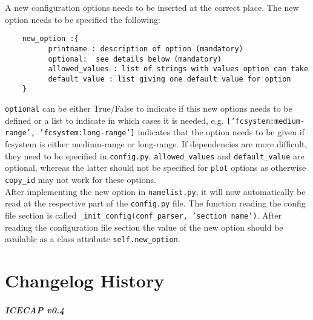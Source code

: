 \documentclass[DIV=10, parskip=full]{scrreprt}
\newcommand{\ice}{\textit{ICECAP}\xspace}
\begin{document}

A new configuration options needs to be inserted at the correct place. The new option needs to be specified the following:\\
\begin{verbatim}
	new_option :{
	      printname : description of option (mandatory)
	      optional:  see details below (mandatory)
	      allowed_values : list of strings with values option can take
	      default_value : list giving one default value for option
	}
\end{verbatim}

\texttt{optional} can be either True/False to indicate if this new options needs to be defined or a list to indicate in which cases it is needed, e.g. \texttt{['fcsystem:medium-range', 'fcsystem:long-range']} indicates that the option needs to be given if fcsystem is either medium-range or long-range. If dependencies are more difficult, they need to be specified in \texttt{config.py}. \texttt{allowed\_values} and \texttt{default\_value} are optional, whereas the latter should not be specified for \texttt{plot} options as otherwise \texttt{copy\_id} may not work for these options.\\

After implementing the new option in \texttt{namelist.py}, it will now automatically be read at the respective part of the \texttt{config.py} file. The function reading the config file section is called \texttt{\_init\_config(conf\_parser, 'section name')}. After reading the configuration file section the value of the new option should be available as a class attribute \texttt{self.new\_option}.

\chapter{Changelog History}

\paragraph{\textbf{\ice v0.4\\[5pt]}}
\end{document}

